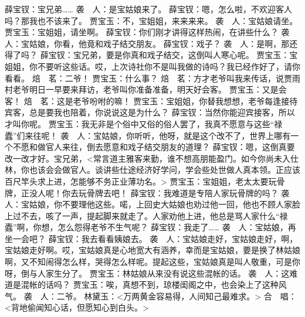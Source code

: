 \documentclass{article}
\begin{document}
薛宝钗：宝兄弟……
袭　人：是宝姑娘来了。
薛宝钗：嗯，怎么啦，不欢迎客人吗？那我也不该来了。
贾宝玉：不，宝姐姐，来来来来。
袭　人：宝姑娘请坐。
贾宝玉：宝姐姐，请坐啊。
薛宝钗：你们刚才讲得这样热闹，在讲些什么？
袭　人：宝姑娘，你看，他竟和戏子结交朋友。
薛宝钗：戏子？
袭　人：是啊，那还得了吗？
薛宝钗：宝兄弟，要是你真和戏子结交，这倒叫人寒心呢。
贾宝玉：宝姐姐，你不要听这些话。哎，上次诗社你不是叫我做的诗吗？我已经作好了，请你看看。
焙　茗：二爷！
贾宝玉：什么事？
焙　茗：方才老爷叫我来传话，说贾雨村老爷明日一早要来拜访，老爷叫你准备准备，明天好会客。
贾宝玉：又是会客！
焙　茗：这是老爷吩咐的嘛！
贾宝玉：宝姐姐，你替我想想，老爷每逢接待宾客，总是要我也陪着，你说说这是为什么？
薛宝钗：当然你能迎宾接客，所以才叫你呢。
贾宝玉：我无非是个俗中又俗的俗人罢了，我真不愿意与这些“禄蠹”们来往呢！
袭　人：宝姑娘，你听听，他呀，就是这个改不了，世界上哪有一个不愿和做官人来往，倒去愿意和戏子结交朋友的道理？
薛宝钗：嗯，这倒真要改一改才好。宝兄弟，<常言道主雅客来勤，谁不想高朋能盈门。如今你尚未入仕林，你也该会会做官人。谈讲些仕途经济好学问，学会些处世做人真本领。正应该百尺竿头求上进，怎能够不务正业薄功名。>
贾宝玉：宝姐姐，老太太要玩骨牌，正没人呢！你去玩骨牌去吧！
薛宝钗：我难道是专陪人家玩骨牌的吗？
袭　人：宝姑娘，你不要理他这些。喏，上回史大姑娘也劝过他一回，他也不顾人家脸上过不去，咳了一声，提起脚来就走了。人家劝他上进，他总是骂人家什么“禄蠹”啊，你想，怎么怨得老爷不生气呢？
薛宝钗：我走了……
袭　人：宝姑娘，再坐一会吧？
薛宝钗：我去看看姨娘去。
袭　人：宝姑娘走好，宝姑娘走好，啊，宝姑娘走好啊。哎，宝姑娘真是心地宽大有涵养，幸而是宝姑娘，要是换了林姑娘啊，又不知闹得怎么样，哭得怎么样呢。提起这些，宝姑娘真是叫人敬重，可是你呀，倒与人家生分了。
贾宝玉：林姑娘从来没有说这些混帐的话。
袭　人：这难道是混帐的话吗？
贾宝玉：唉，真想不到，琼楼闺阁之中，也会染上了这种风气。
袭　人：二爷。
林黛玉：<万两黄金容易得，人间知己最难求。>
合　唱：<背地偷闻知心话，但愿知心到白头。>
\end{document}

